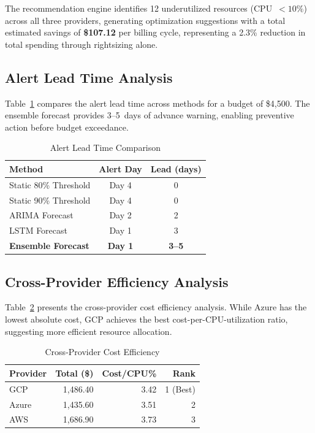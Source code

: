 \documentclass[conference]{IEEEtran}
\begin{document}
The recommendation engine identifies 12 underutilized resources (CPU~$<10\%$) across all three providers, generating optimization suggestions with a total estimated savings of \textbf{\$107.12} per billing cycle, representing a 2.3\% reduction in total spending through rightsizing alone.

\subsection{Alert Lead Time Analysis}

Table~\ref{tab:alertlead} compares the alert lead time across methods for a budget of \$4,500. The ensemble forecast provides 3--5~days of advance warning, enabling preventive action before budget exceedance.

\begin{table}[htbp]
\caption{Alert Lead Time Comparison}
\label{tab:alertlead}
\centering
\begin{tabular}{@{}lcc@{}}
\toprule
\textbf{Method} & \textbf{Alert Day} & \textbf{Lead (days)} \\
\midrule
Static 80\% Threshold & Day 4 & 0 \\
Static 90\% Threshold & Day 4 & 0 \\
ARIMA Forecast & Day 2 & 2 \\
LSTM Forecast & Day 1 & 3 \\
\textbf{Ensemble Forecast} & \textbf{Day 1} & \textbf{3--5} \\
\bottomrule
\end{tabular}
\end{table}

\subsection{Cross-Provider Efficiency Analysis}

Table~\ref{tab:efficiency} presents the cross-provider cost efficiency analysis. While Azure has the lowest absolute cost, GCP achieves the best cost-per-CPU-utilization ratio, suggesting more efficient resource allocation.

\begin{table}[htbp]
\caption{Cross-Provider Cost Efficiency}
\label{tab:efficiency}
\centering
\begin{tabular}{@{}lrrr@{}}
\toprule
\textbf{Provider} & \textbf{Total (\$)} & \textbf{Cost/CPU\%} & \textbf{Rank} \\
\midrule
GCP & 1,486.40 & 3.42 & 1 (Best) \\
Azure & 1,435.60 & 3.51 & 2 \\
AWS & 1,686.90 & 3.73 & 3 \\
\bottomrule
\end{tabular}
\end{table}
\end{document}
